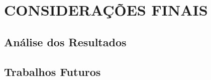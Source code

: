\chapter{CONSIDERAÇÕES FINAIS}

\section{Análise dos Resultados} %
\label{sec:analise_resultados}


\section{Trabalhos Futuros} %
\label{sec:trabalhos_futuros}


